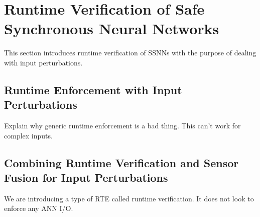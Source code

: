 \section{Runtime Verification of Safe Synchronous Neural Networks}
This section introduces runtime verification of SSNNs with the purpose of dealing with input perturbations.

\subsection{Runtime Enforcement with Input Perturbations}
Explain why generic runtime enforcement is a bad thing. 
This can't work for complex inputs.

\subsection{Combining Runtime Verification and Sensor Fusion for Input Perturbations}
We are introducing a type of RTE called runtime verification.
It does not look to enforce any ANN I/O.

